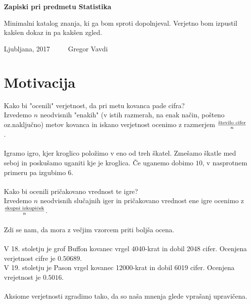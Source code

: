 \documentclass[11pt]{article}
\begin{document}
	
	\thispagestyle{empty}
	\begin{center}
		\begin{Large}
			{\bf Zapiski pri predmetu Statistika}
		\end{Large}
		
	\end{center}
	Minimalni katalog znanja, ki ga bom sproti dopolnjeval. Verjetno bom izpustil kakšen dokaz in pa kakšen zgled.
	\vfill
	\begin{center}
		Ljubljana, 2017 $\quad \quad $ Gregor Vavdi
	\end{center}
	\newpage
	\setcounter{page}{1}
	
	\section{Motivacija}
	Kako bi "ocenili" verjetnost, da pri metu kovanca pade cifra?
	\\
	Izvedemo $n$ neodvisnih "enakih" (v istih razmerah, na enak način, pošteno oz.naključno) metov kovanca in iskano verjetnost ocenimo z razmerjem $\frac{\textnormal{število cifer}}{n}$.
	\\
	\\
	Igramo igro, kjer kroglico položimo v eno od treh škatel. Zmešamo škatle med seboj in poskušamo uganiti kje je kroglica. Če uganemo dobimo $10$, v nasprotnem primeru pa izgubimo $6$.
	\\
	\\
	Kako bi ocenili pričakovano vrednost te igre?
	\\
	Izvedemo $n$ neodvisnih slučajnih iger in pričakovano vrednost ene igre ocenimo z $\frac{\textnormal{skupni izkupiček}}{n}$.
	\\
	\\
	Zdi se nam, da mora z večjim vzorcem priti boljša ocena.
	\\
	\\
	V 18. stoletju je grof Buffon kovanec vrgel 4040-krat in dobil 2048 cifer. Ocenjena verjetnost cifre je $0.50689$.
	\\
	V 19. stoletju je Pason vrgel kovanec 12000-krat in dobil 6019 cifer. Ocenjena vrejetnost je $0.5016$.
	\\
	\\
	Aksiome verjetnosti zgradimo tako, da so naša mnenja glede vprašanj upravičena.
	
\end{document}
